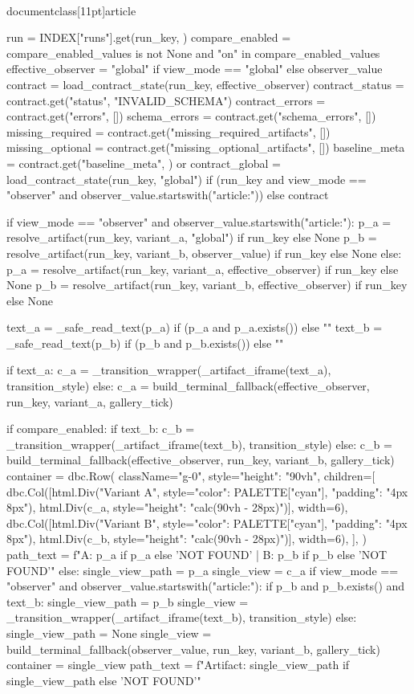 \\documentclass[11pt]{article}
\begin{document}
\begin{CodeBlock}
{{{{{{{{    run = INDEX["runs"].get(run_key, {})
    compare_enabled = compare_enabled_values is not None and "on" in compare_enabled_values
    effective_observer = "global" if view_mode == "global" else observer_value
    contract = load_contract_state(run_key, effective_observer)
    contract_status = contract.get("status", "INVALID_SCHEMA")
    contract_errors = contract.get("errors", [])
    schema_errors = contract.get("schema_errors", [])
    missing_required = contract.get("missing_required_artifacts", [])
    missing_optional = contract.get("missing_optional_artifacts", [])
    baseline_meta = contract.get("baseline_meta", {}) or {}
    contract_global = load_contract_state(run_key, "global") if (run_key and view_mode == "observer" and observer_value.startswith("article:")) else contract

    if view_mode == "observer" and observer_value.startswith("article:"):
        p_a = resolve_artifact(run_key, variant_a, "global") if run_key else None
        p_b = resolve_artifact(run_key, variant_b, observer_value) if run_key else None
    else:
        p_a = resolve_artifact(run_key, variant_a, effective_observer) if run_key else None
        p_b = resolve_artifact(run_key, variant_b, effective_observer) if run_key else None

    text_a = _safe_read_text(p_a) if (p_a and p_a.exists()) else ""
    text_b = _safe_read_text(p_b) if (p_b and p_b.exists()) else ""

    if text_a:
        c_a = _transition_wrapper(_artifact_iframe(text_a), transition_style)
    else:
        c_a = build_terminal_fallback(effective_observer, run_key, variant_a, gallery_tick)

    if compare_enabled:
        if text_b:
            c_b = _transition_wrapper(_artifact_iframe(text_b), transition_style)
        else:
            c_b = build_terminal_fallback(effective_observer, run_key, variant_b, gallery_tick)
        container = dbc.Row(
            className="g-0",
            style={"height": "90vh"},
            children=[
                dbc.Col([html.Div("Variant A", style={"color": PALETTE["cyan"], "padding": "4px 8px"}), html.Div(c_a, style={"height": "calc(90vh - 28px)"})], width=6),
                dbc.Col([html.Div("Variant B", style={"color": PALETTE["cyan"], "padding": "4px 8px"}), html.Div(c_b, style={"height": "calc(90vh - 28px)"})], width=6),
            ],
        )
        path_text = f"A: {p_a if p_a else 'NOT FOUND'} | B: {p_b if p_b else 'NOT FOUND'}"
    else:
        single_view_path = p_a
        single_view = c_a
        if view_mode == "observer" and observer_value.startswith("article:"):
            if p_b and p_b.exists() and text_b:
                single_view_path = p_b
                single_view = _transition_wrapper(_artifact_iframe(text_b), transition_style)
            else:
                single_view_path = None
                single_view = build_terminal_fallback(observer_value, run_key, variant_b, gallery_tick)
        container = single_view
        path_text = f"Artifact: {single_view_path if single_view_path else 'NOT FOUND'}"

}}}}}}}}
\end{CodeBlock}
\end{document}
